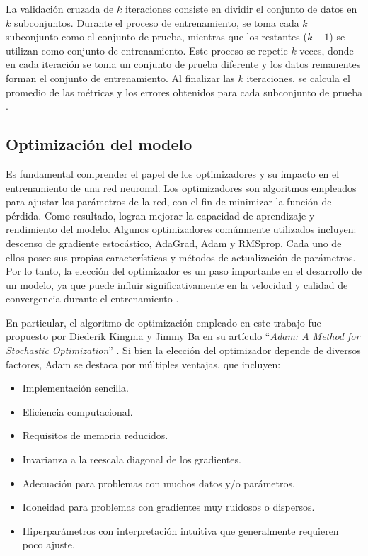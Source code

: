 La validación cruzada de $k$ iteraciones consiste en dividir el conjunto de datos en $k$ subconjuntos. Durante 
el proceso de entrenamiento, se toma cada $k$ subconjunto como el conjunto de prueba, mientras que los 
restantes ($k-1$) se utilizan como conjunto de entrenamiento. Este proceso se repetie $k$ veces, donde 
en cada iteración se toma un conjunto de prueba diferente y los datos remanentes forman el conjunto 
de entrenamiento. Al finalizar las $k$ iteraciones, se calcula el promedio de las métricas y los errores 
obtenidos para cada subconjunto de prueba \citep{CITE:48}.

\filbreak
\subsection{Optimización del modelo}
Es fundamental comprender el papel de los optimizadores y su impacto en el entrenamiento de una red neuronal. 
Los optimizadores son algoritmos empleados para ajustar los parámetros de la red, con el fin de minimizar 
la función de pérdida. Como resultado, logran mejorar la capacidad de aprendizaje y rendimiento del modelo. 
Algunos optimizadores comúnmente utilizados incluyen: descenso de gradiente estocástico, AdaGrad, Adam y RMSprop. 
Cada uno de ellos posee sus propias características y métodos de actualización de parámetros. Por lo tanto, 
la elección del optimizador es un paso importante en el desarrollo de un modelo, ya que puede influir 
significativamente en la velocidad y calidad de convergencia durante el entrenamiento \citep{CITE:44}.


En particular, el algoritmo de optimización empleado en este trabajo fue propuesto por 
Diederik Kingma y Jimmy Ba en su artículo ``\emph{Adam: A Method for Stochastic Optimization}'' \citep{CITE:49}. Si bien 
la elección del optimizador depende de diversos factores, Adam se destaca por múltiples ventajas, que incluyen:

\begin{itemize}
	\item Implementación sencilla.
	\item Eficiencia computacional.
	\item Requisitos de memoria reducidos.
	\item Invarianza a la reescala diagonal de los gradientes.
	\item Adecuación para problemas con muchos datos y/o parámetros.
	\item Idoneidad para problemas con gradientes muy ruidosos o dispersos.
	\item Hiperparámetros con interpretación intuitiva que generalmente requieren poco ajuste.
\end{itemize}


